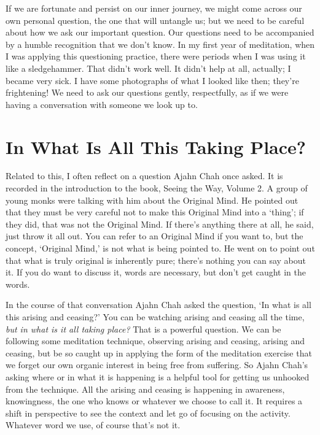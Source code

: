 If we are fortunate and persist on our inner journey, we might come
across our own personal question, the one that will untangle us; but we
need to be careful about how we ask our important question. Our
questions need to be accompanied by a humble recognition that we don’t
know. In my first year of meditation, when I was applying this
questioning practice, there were periods when I was using it like a
sledgehammer. That didn’t work well. It didn’t help at all, actually; I
became very sick. I have some photographs of what I looked like then;
they’re frightening! We need to ask our questions gently, respectfully,
as if we were having a conversation with someone we look up to.

\section{In What Is All This Taking Place?}

Related to this, I often reflect on a question Ajahn Chah once asked.
It is recorded in the introduction to the book, Seeing the Way, Volume
2\cite{seeing-vol2}. A group of young monks were talking with him about the Original
Mind. He pointed out that they must be very careful not to make this
Original Mind into a ‘thing’; if they did, that was not the Original
Mind. If there’s anything there at all, he said, just throw it all out.
You can refer to an Original Mind if you want to, but the concept,
‘Original Mind,’ is not what is being pointed to. He went on to point
out that what is truly original is inherently pure; there’s nothing you
can say about it. If you do want to discuss it, words are necessary, but
don’t get caught in the words.

In the course of that conversation Ajahn Chah asked the question, ‘In
what is all this arising and ceasing?’ You can be watching arising and
ceasing all the time, \emph{but in what is it all taking place?} That is a
powerful question. We can be following some meditation technique,
observing arising and ceasing, arising and ceasing, but be so caught up
in applying the form of the meditation exercise that we forget our own
organic interest in being free from suffering. So Ajahn Chah’s asking
where or in what it is happening is a helpful tool for getting us
unhooked from the technique. All the arising and ceasing is happening in
awareness, knowingness, the one who knows or whatever we choose to call
it. It requires a shift in perspective to see the context and let go of
focusing on the activity. Whatever word we use, of course that’s not it.

